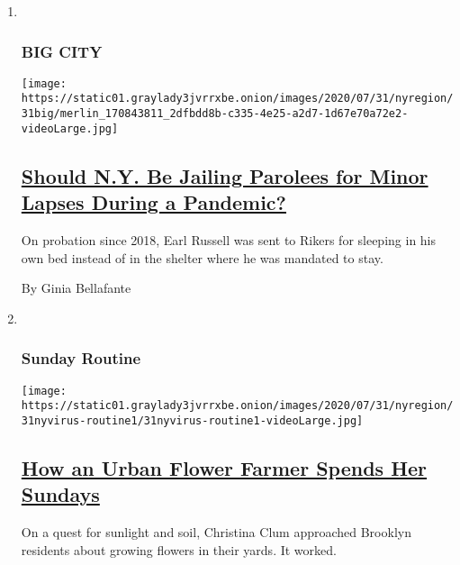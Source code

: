 \begin{enumerate}
\def\labelenumi{\arabic{enumi}.}
\item ~
  \hypertarget{big-city}{%
  \subsubsection{BIG CITY}\label{big-city}}

  \texttt{[image: https://static01.graylady3jvrrxbe.onion/images/2020/07/31/nyregion/31big/merlin\_170843811\_2dfbdd8b-c335-4e25-a2d7-1d67e70a72e2-videoLarge.jpg]}

  \hypertarget{should-ny-be-jailing-parolees-for-minor-lapses-during-a-pandemic}{%
  \subsection{\texorpdfstring{\href{/2020/07/31/nyregion/ny-parole-violations.html}{Should
  N.Y. Be Jailing Parolees for Minor Lapses During a
  Pandemic?}}{Should N.Y. Be Jailing Parolees for Minor Lapses During a Pandemic?}}\label{should-ny-be-jailing-parolees-for-minor-lapses-during-a-pandemic}}

  On probation since 2018, Earl Russell was sent to Rikers for sleeping
  in his own bed instead of in the shelter where he was mandated to
  stay.

  By Ginia Bellafante
\item ~
  \hypertarget{sunday-routine}{%
  \subsubsection{Sunday Routine}\label{sunday-routine}}

  \texttt{[image: https://static01.graylady3jvrrxbe.onion/images/2020/07/31/nyregion/31nyvirus-routine1/31nyvirus-routine1-videoLarge.jpg]}

  \hypertarget{how-an-urban-flower-farmer-spends-her-sundays}{%
  \subsection{\texorpdfstring{\href{/2020/07/31/nyregion/urban-gardening-nyc.html}{How
  an Urban Flower Farmer Spends Her
  Sundays}}{How an Urban Flower Farmer Spends Her Sundays}}\label{how-an-urban-flower-farmer-spends-her-sundays}}

  On a quest for sunlight and soil, Christina Clum approached Brooklyn
  residents about growing flowers in their yards. It worked.


\end{enumerate}

